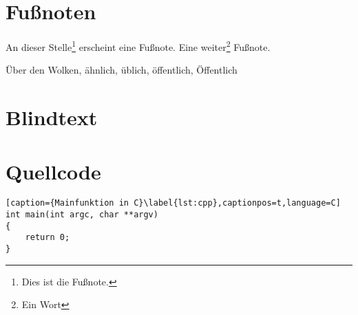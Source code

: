 \section{Fußnoten}
\label{sec:Fussnoten}

An dieser Stelle\footnote{Dies ist die Fußnote.} erscheint eine Fußnote. Eine weiter\footnote{Ein Wort} Fußnote.

Über den Wolken, ähnlich, üblich, öffentlich, Öffentlich

\section{Blindtext}
\label{sec:Blindtext}

\lipsum[1-2]

\section{Quellcode}
\label{sec:Quellcode}

\begin{lstlisting}[caption={Mainfunktion in C}\label{lst:cpp},captionpos=t,language=C]
int main(int argc, char **argv)
{
	return 0;
}
\end{lstlisting}